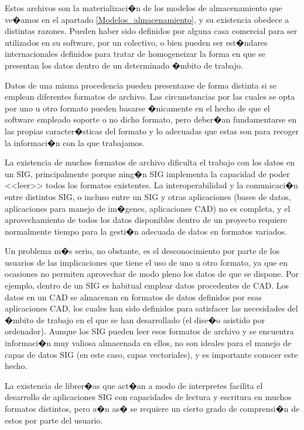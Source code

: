 Estos archivos son la materializaci�n de los modelos de almacenamiento que ve�amos en el apartado \ref{Modelos_almacenamiento}, y su existencia obedece a distintas razones. Pueden haber sido definidos por alguna casa comercial para ser utilizados en su software, por un colectivo, o bien pueden ser est�ndares internacionales definidos para tratar de homogeneizar la forma en que se presentan los datos dentro de un determinado �mbito de trabajo.

Datos de una misma procedencia pueden presentarse de forma distinta si se emplean diferentes formatos de archivo. Las circunstancias por las cuales se opta por uno u otro formato pueden basarse �nicamente en el hecho de que el software empleado soporte o no dicho formato, pero deber�an fundamentarse en las propias caracter�sticas del formato y lo adecuadas que estas son para recoger la informaci�n con la que trabajamos.

La existencia de muchos formatos de archivo dificulta el trabajo con los datos en un SIG, principalmente porque ning�n SIG implementa la capacidad de poder <<leer>> todos los formatos existentes. La interoperabilidad y la comunicaci�n entre distintos SIG, o incluso entre un SIG y otras aplicaciones (bases de datos, aplicaciones para manejo de im�genes, aplicaciones CAD) no es completa, y el aprovechamiento de todos los datos disponibles dentro de un proyecto requiere normalmente tiempo para la gesti�n adecuada de datos en formatos variados.

Un problema m�s serio, no obstante, es el desconocimiento por parte de los usuarios de las implicaciones que tiene el uso de uno u otro formato, ya que en ocasiones no permiten aprovechar de modo pleno los datos de que se dispone. Por ejemplo, dentro de un SIG es habitual emplear datos procedentes de CAD. Los datos en un CAD se almacenan en formatos de datos definidos por esas aplicaciones CAD, los cuales han sido definidos para satisfacer las necesidades del �mbito de trabajo en el que se han desarrollado (el dise�o asistido por ordenador). Aunque los SIG pueden leer esos formatos de archivo y se encuentra informaci�n muy valiosa almacenada en ellos, no son ideales para el manejo de capas de datos SIG (en este caso, capas vectoriales), y es importante conocer este hecho.

La existencia de librer�as que act�an a modo de interpretes facilita el desarrollo de aplicaciones SIG con capacidades de lectura y escritura en muchos formatos distintos, pero a�n as� se requiere un cierto grado de comprensi�n de estos por parte del usuario.

